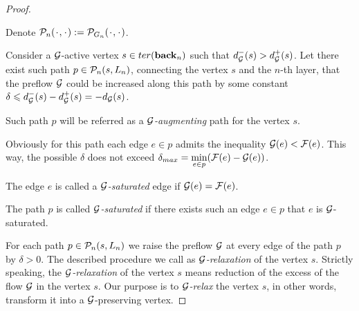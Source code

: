 \documentclass[12pt]{article}
\begin{document}
\begin{proof}
      \begin{definition*}
        Denote $\gnpaths(\makebox[1ex]{$\cdot$}, \makebox[1ex]{$\cdot$}) := \cal{P}_{G_n}(\makebox[1ex]{$\cdot$},\makebox[1ex]{$\cdot$})$.
      \end{definition*}
      Consider a $\cal{G}$-active vertex $s \in \ter(\eback_n)$ such that $d_{\cal{G}}^{-}(s) > d_{\cal{G}}^{+}(s)$.
      Let there exist such path $p \in \gnpaths(s, L_n)$, connecting the vertex $s$ and the $n$-th layer, that
        the preflow $\cal{G}$ could be increased along this path by some constant
        $\delta \leq d_{\cal{G}}^{-}(s) - d_{\cal{G}}^{+}(s) = -d_{\cal{G}}(s)$.
      \begin{definition}
        Such path $p$ will be referred as a \emph{$\cal{G}$-augmenting} path for the vertex $s$.
      \end{definition}
      Obviously for this path each edge $e \in p$ admits the inequality $\cal{G}(e) < \flowpos(e)$.
      This way, the possible $\delta$ does not exceed $\delta_{max}=\min\limits_{e \in p}(\flowpos(e) - \cal{G}(e))$.
      \begin{definition}
        The edge $e$ is called a \emph{$\cal{G}$-saturated} edge if $\cal{G}(e) = \flowpos(e)$.
      \end{definition}
      \begin{definition}
        The path $p$ is called \emph{$\cal{G}$-saturated} if there exists such an edge $e \in p$ that $e$ is $\cal{G}$-saturated.
      \end{definition}
      For each path $p \in \gnpaths(s, L_n)$ we raise the preflow $\cal{G}$ at every edge of the path $p$
      by $\delta > 0$.
      The described procedure we call as \emph{$\cal{G}$-relaxation} of the vertex $s$.
      Strictly speaking, the \emph{$\cal{G}$-relaxation}
        of the vertex $s$ means reduction of the excess of the flow $\cal{G}$ in the vertex $s$.
      Our purpose is to \emph{$\cal{G}$-relax} the vertex $s$, in other words, transform it into a $\cal{G}$-preserving vertex.


\end{proof}
\end{document}
